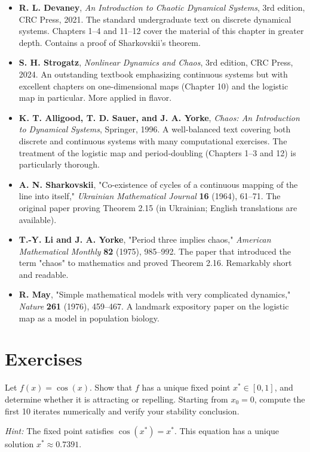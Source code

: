 \begin{itemize}[nosep]
  \item \textbf{R. L. Devaney}, \textit{An Introduction to Chaotic Dynamical Systems}, 3rd edition, CRC Press, 2021. The standard undergraduate text on discrete dynamical systems. Chapters 1--4 and 11--12 cover the material of this chapter in greater depth. Contains a proof of Sharkovskii's theorem.

  \item \textbf{S. H. Strogatz}, \textit{Nonlinear Dynamics and Chaos}, 3rd edition, CRC Press, 2024. An outstanding textbook emphasizing continuous systems but with excellent chapters on one-dimensional maps (Chapter 10) and the logistic map in particular. More applied in flavor.

  \item \textbf{K. T. Alligood, T. D. Sauer, and J. A. Yorke}, \textit{Chaos: An Introduction to Dynamical Systems}, Springer, 1996. A well-balanced text covering both discrete and continuous systems with many computational exercises. The treatment of the logistic map and period-doubling (Chapters 1--3 and 12) is particularly thorough.

  \item \textbf{A. N. Sharkovskii}, "Co-existence of cycles of a continuous mapping of the line into itself," \textit{Ukrainian Mathematical Journal} \textbf{16} (1964), 61--71. The original paper proving Theorem 2.15 (in Ukrainian; English translations are available).

  \item \textbf{T.-Y. Li and J. A. Yorke}, "Period three implies chaos," \textit{American Mathematical Monthly} \textbf{82} (1975), 985--992. The paper that introduced the term "chaos" to mathematics and proved Theorem 2.16. Remarkably short and readable.

  \item \textbf{R. May}, "Simple mathematical models with very complicated dynamics," \textit{Nature} \textbf{261} (1976), 459--467. A landmark expository paper on the logistic map as a model in population biology.
\end{itemize}


\section*{Exercises}

\begin{exercise}
Let $f(x) = \cos(x)$. Show that $f$ has a unique fixed point $x^* \in [0,1]$, and determine whether it is attracting or repelling. Starting from $x_0 = 0$, compute the first 10 iterates numerically and verify your stability conclusion.

\textit{Hint:} The fixed point satisfies $\cos(x^*) = x^*$. This equation has a unique solution $x^* \approx 0.7391$.
\end{exercise}



